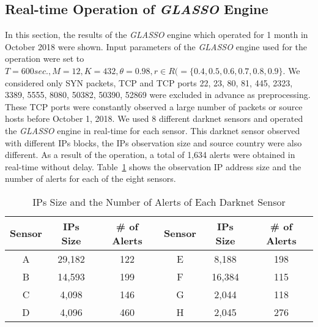 \documentclass[conference]{IEEEtran}
\begin{document}
\subsection{Real-time Operation of {\it GLASSO} Engine}
In this section, the results of the {\it GLASSO} engine which operated for 1 month in October 2018 were shown.
Input parameters of the {\it GLASSO} engine used for the operation were set to $T=600 sec., M=12, K=432, \theta=0.98, r \in R ( = \{0.4, 0.5, 0.6, 0.7, 0.8, 0.9\}$.
We considered only SYN packets, TCP and TCP ports 22, 23, 80, 81, 445, 2323, 3389, 5555, 8080, 50382, 50390, 52869 were excluded in advance as preprocessing.
These TCP ports were constantly observed a large number of packets or source hosts before October 1, 2018.
We used 8 different darknet sensors and operated the {\it GLASSO} engine in real-time for each sensor.
This darknet sensor observed with different IPs blocks, the IPs observation size and source country were also different.
As a result of the operation, a total of 1,634 alerts were obtained in real-time without delay.
Table~\ref{tab:sensor} shows the observation IP address size and the number of alerts for each of the eight sensors.

\begin{table}[tb]
  \begin{center}
    \caption{IPs Size and the Number of Alerts of Each Darknet Sensor}
  \begin{tabular}{c|c|c||c|c|c} \hline
  Sensor & IPs Size & \# of Alerts & Sensor & IPs Size & \# of Alerts \\ \hline\hline
  A & 29,182 & 122 & E & 8,188 & 198 \\ \hline
  B & 14,593 & 199 & F & 16,384 & 115 \\ \hline
  C & 4,098 & 146 & G & 2,044 & 118 \\ \hline
  D & 4,096 & 460 & H & 2,045 & 276 \\ \hline
  \end{tabular}
  \label{tab:sensor}
  \end{center}
\end{table}
\end{document}

